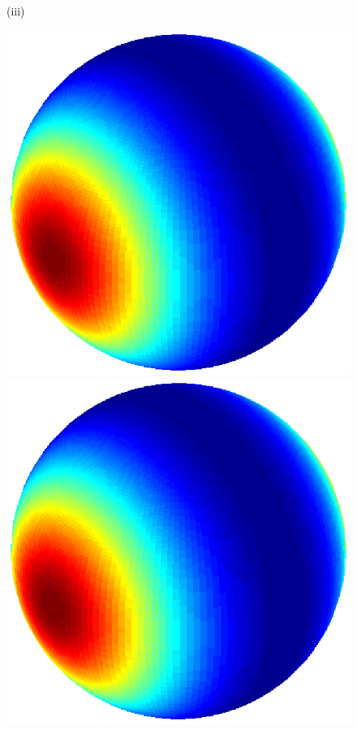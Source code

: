 \documentclass[dvips,aoas,preprint]{imsart}
\numberwithin{equation}{section}
\theoremstyle{plain}
\begin{document}
\begin{figure}[!htbp]
\begin{minipage}[]{0.12\textwidth}
    \end{minipage}\\
    (iii)
    \begin{minipage}[]{0.12\textwidth}
      \centering
      \includegraphics*[width=\textwidth]{figure3a1.eps}
    \end{minipage}
    \begin{minipage}[]{0.12\textwidth}
      \centering
      \includegraphics*[width=\textwidth]{figure3a1.eps}

\end{minipage}
\end{figure}
\end{document}
